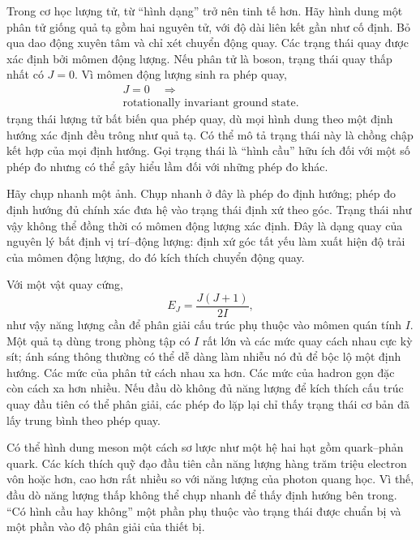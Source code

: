 Trong cơ học lượng tử, từ ``hình dạng'' trở nên tinh tế hơn. Hãy hình dung một phân tử giống quả tạ gồm hai nguyên tử, với độ dài liên kết gần như cố định. Bỏ qua dao động xuyên tâm và chỉ xét chuyển động quay. Các trạng thái quay được xác định bởi mômen động lượng. Nếu phân tử là boson, trạng thái quay thấp nhất có \(J=0\). Vì mômen động lượng sinh ra phép quay,
\begin{equation}
\begin{gathered}
J=0 \quad\Longrightarrow\\
\text{rotationally invariant ground state.}
\end{gathered}
\end{equation}
trạng thái lượng tử bất biến qua phép quay, dù mọi hình dung theo một định hướng xác định đều trông như quả tạ. Có thể mô tả trạng thái này là chồng chập kết hợp của mọi định hướng. Gọi trạng thái là ``hình cầu'' hữu ích đối với một số phép đo nhưng có thể gây hiểu lầm đối với những phép đo khác.

Hãy chụp nhanh một ảnh. Chụp nhanh ở đây là phép đo định hướng; phép đo định hướng đủ chính xác đưa hệ vào trạng thái định xứ theo góc. Trạng thái như vậy không thể đồng thời có mômen động lượng xác định. Đây là dạng quay của nguyên lý bất định vị trí--động lượng: định xứ góc tất yếu làm xuất hiện độ trải của mômen động lượng, do đó kích thích chuyển động quay.

Với một vật quay cứng,
\begin{equation}
E_J=\frac{J(J+1)}{2I},
\end{equation}
như vậy năng lượng cần để phân giải cấu trúc phụ thuộc vào mômen quán tính \(I\). Một quả tạ dùng trong phòng tập có \(I\) rất lớn và các mức quay cách nhau cực kỳ sít; ánh sáng thông thường có thể dễ dàng làm nhiễu nó đủ để bộc lộ một định hướng. Các mức của phân tử cách nhau xa hơn. Các mức của hadron gọn đặc còn cách xa hơn nhiều. Nếu đầu dò không đủ năng lượng để kích thích cấu trúc quay đầu tiên có thể phân giải, các phép đo lặp lại chỉ thấy trạng thái cơ bản đã lấy trung bình theo phép quay.

Có thể hình dung meson một cách sơ lược như một hệ hai hạt gồm quark--phản quark. Các kích thích quỹ đạo đầu tiên cần năng lượng hàng trăm triệu electron vôn hoặc hơn, cao hơn rất nhiều so với năng lượng của photon quang học. Vì thế, đầu dò năng lượng thấp không thể chụp nhanh để thấy định hướng bên trong. ``Có hình cầu hay không'' một phần phụ thuộc vào trạng thái được chuẩn bị và một phần vào độ phân giải của thiết bị.

